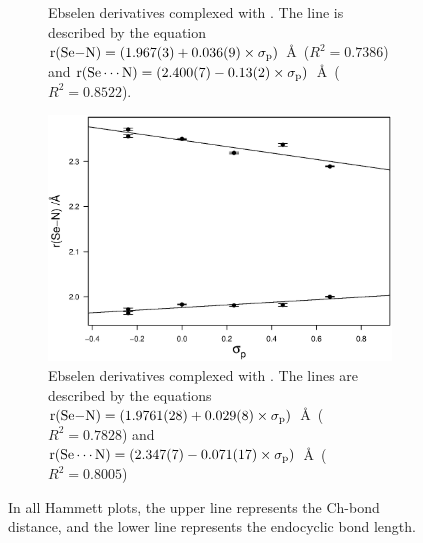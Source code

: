 \begin{refsection}
\begin{figure}
\begin{subfigure}[t]{0.45\linewidth}
\caption{Ebselen derivatives complexed with . The line is described by the equation $\mathrm{r}(\ce{Se-N}) = (1.967(3) + 0.036(9) \times \sigma_\text{p})$~\AA~($R^2=0.7386$) and $\mathrm{r}(\ce{Se\cdots N}) = (2.400(7) - 0.13(2) \times \sigma_\text{p})$~\AA~($R^2=0.8522$).}\label{fig:hammett-morph-para}
\end{subfigure}
\hfill
\begin{subfigure}[t]{0.45\linewidth}
\centering
\includegraphics[width=\linewidth]{Figures/hammett-pyrrol-p.eps}
\caption{Ebselen derivatives complexed with . The lines are described by the equations $\mathrm{r}(\ce{Se-N}) = (1.9761(28) + 0.029(8) \times \sigma_\text{p})$~\AA~($R^2=0.7828$) and $\mathrm{r}(\ce{Se\cdots N}) = (2.347(7) - 0.071(17) \times \sigma_\text{p})$~\AA~($R^2=0.8005$)}\label{fig:hammett-pyrrol-para}
\end{subfigure}
\caption[Hammett plots of endocyclic  bond length and  Ch-bond length of ebselen derivatives complexed with various Lewis bases ($\sigma_\text{p}$).]{In all Hammett plots, the upper line represents the  Ch-bond distance, and the lower line represents the endocyclic  bond length.}
\end{figure}


\end{refsection}
